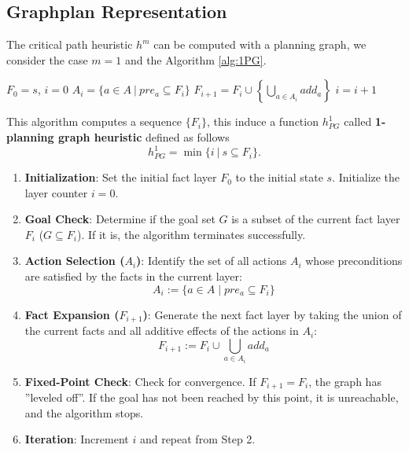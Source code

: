 \documentclass[10pt, letterpaper]{report}
\begin{document}
\subsection{Graphplan Representation}
The critical path heuristic $h^m$ can be computed with a planning graph, we consider the case $m=1$ and the Algorithm \ref{alg:1PG}.

\begin{algorithm}
\caption{1-Planning-Graph}\label{alg:1PG}
\begin{algorithmic}[1]
\State $F_0=s$, $i=0$
\State $A_i=\{a\in A \ | \ pre_a\subseteq F_i\}$
\State $\displaystyle F_{i+1}=F_i\cup \left\{ \bigcup_{a\in A_i}add_a \right\}$
\State\Return 
\EndIf
\State $i=i+1$
\EndWhile
\end{algorithmic}
\end{algorithm}

This algorithm computes a sequence $\{F_i\}$, this induce a function $h^1_{PG}$ called \textbf{1-planning graph heuristic} defined as follows\begin{equation}
    h^1_{PG}=\min\{i \ | \ s\subseteq F_i\}.
\end{equation}

\begin{enumerate}\item \textbf{Initialization}: Set the initial fact layer $F_0$ to the initial state $s$. Initialize the layer counter $i = 0$.\item \textbf{Goal Check}: Determine if the goal set $G$ is a subset of the current fact layer $F_i$ ($G \subseteq F_i$). If it is, the algorithm terminates successfully.\item \textbf{Action Selection ($A_i$)}: Identify the set of all actions $A_i$ whose preconditions are satisfied by the facts in the current layer:$$A_i := \{a \in A \mid pre_a \subseteq F_i\}$$\item \textbf{Fact Expansion ($F_{i+1}$)}: Generate the next fact layer by taking the union of the current facts and all additive effects of the actions in $A_i$:$$F_{i+1} := F_i \cup \bigcup_{a \in A_i} add_a$$\item \textbf{Fixed-Point Check}: Check for convergence. If $F_{i+1} = F_i$, the graph has ''leveled off''. If the goal has not been reached by this point, it is unreachable, and the algorithm stops.\item \textbf{Iteration}: Increment $i$ and repeat from Step 2.\end{enumerate}
\end{document}
